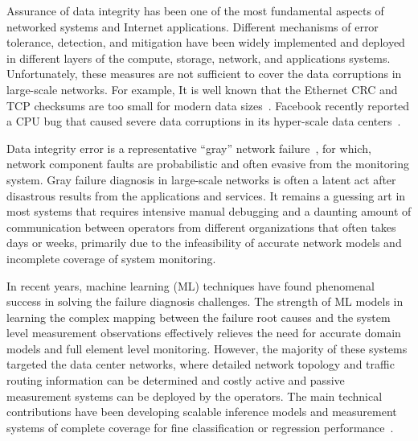 Assurance of data integrity has been one of the most fundamental aspects of networked systems and Internet applications. 
Different mechanisms of error tolerance, detection, and mitigation have been widely implemented and deployed in different layers of 
the compute, storage, network, and applications systems. Unfortunately, these measures are not sufficient to cover the data corruptions 
in large-scale networks. For example, It is well known that the Ethernet CRC and TCP checksums are too small for 
modern data sizes~\cite{tcp:ccr2000}. Facebook recently reported a CPU bug that caused severe data corruptions in its hyper-scale data 
centers~\cite{facebook:cpu:2021}. 


Data integrity error is a representative ``gray'' network failure~\cite{GrayFailure:2017}, for which, 
network component faults are probabilistic and often evasive from the monitoring system. Gray failure diagnosis in large-scale networks 
is often a latent act after disastrous results from the applications and services. It remains a guessing art in most systems that requires intensive 
manual debugging and a daunting amount of communication between operators 
from different organizations that often takes days or weeks, primarily due to the infeasibility of accurate network models and 
incomplete coverage of system monitoring. 

In recent years, machine learning (ML) techniques have found phenomenal success in solving the failure diagnosis challenges.
The strength of ML models in learning the complex mapping between the failure root causes and the system level measurement 
observations effectively relieves the need for accurate domain models and full element level monitoring.  However, the majority of 
these systems targeted the data center networks, where detailed network topology and traffic routing information can be determined and 
costly active and passive measurement systems can be deployed by the operators. The main 
technical contributions have been developing scalable inference models and measurement systems of complete coverage for 
fine classification or regression performance~\cite{netbouncer:nsdi18,DeepView:NSDI18,arzani2018democratically}.


